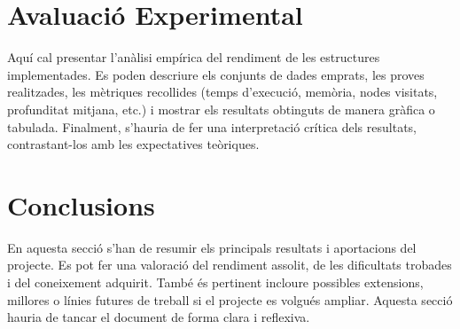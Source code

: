 \section{Avaluació Experimental}

Aquí cal presentar l’anàlisi empírica del rendiment de les estructures implementades. Es poden descriure els conjunts de dades emprats, les proves realitzades, les mètriques recollides (temps d’execució, memòria, nodes visitats, profunditat mitjana, etc.) i mostrar els resultats obtinguts de manera gràfica o tabulada. Finalment, s’hauria de fer una interpretació crítica dels resultats, contrastant-los amb les expectatives teòriques.

\section{Conclusions}

En aquesta secció s’han de resumir els principals resultats i aportacions del projecte. Es pot fer una valoració del rendiment assolit, de les dificultats trobades i del coneixement adquirit. També és pertinent incloure possibles extensions, millores o línies futures de treball si el projecte es volgués ampliar. Aquesta secció hauria de tancar el document de forma clara i reflexiva.
